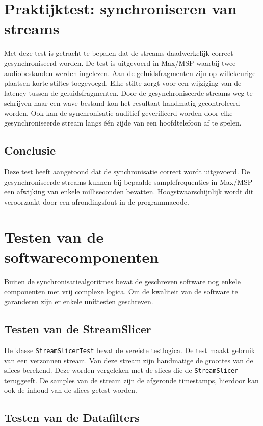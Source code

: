 \section{Praktijktest: synchroniseren van streams}

Met deze test is getracht te bepalen dat de streams daadwerkelijk correct gesynchroniseerd worden. De test is uitgevoerd in Max/MSP waarbij twee audiobestanden werden ingelezen. Aan de geluidsfragmenten zijn op willekeurige plaatsen korte stiltes toegevoegd. Elke stilte zorgt voor een wijziging van de latency tussen de geluidsfragmenten. Door de gesynchroniseerde streams weg te schrijven naar een wave-bestand kon het resultaat handmatig gecontroleerd worden. Ook kan de synchronisatie auditief geverifieerd worden door elke gesynchroniseerde stream langs één zijde van een hoofdtelefoon af te spelen.

\subsection{Conclusie}

Deze test heeft aangetoond dat de synchronisatie correct wordt uitgevoerd. De gesynchroniseerde streams kunnen bij bepaalde samplefrequenties in Max/MSP een afwijking van enkele milliseconden bevatten. Hoogstwaarschijnlijk wordt dit veroorzaakt door een afrondingsfout in de programmacode.

\section{Testen van de softwarecomponenten}

Buiten de synchronisatiealgoritmes bevat de geschreven software nog enkele componenten met vrij complexe logica. Om de kwaliteit van de software te garanderen zijn er enkele unittesten geschreven.

\subsection{Testen van de StreamSlicer}

De klasse \texttt{StreamSlicerTest} bevat de vereiste testlogica. De test maakt gebruik van een verzonnen stream. Van deze stream zijn handmatige de groottes van de slices berekend. Deze worden vergeleken met de slices die de \texttt{StreamSlicer} teruggeeft. De samples van de stream zijn de afgeronde timestamps, hierdoor kan ook de inhoud van de slices getest worden.


\subsection{Testen van de Datafilters}


